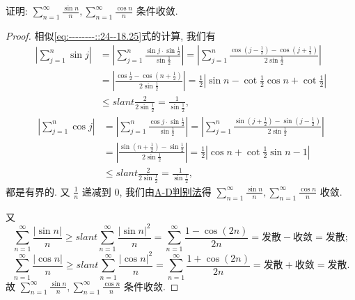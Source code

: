 \documentclass[../../main.tex]{subfiles}
\begin{document}
\begin{example}
证明: $\sum_{n=1}^{\infty} \frac{\sin n}{n}, \sum_{n=1}^{\infty} \frac{\cos n}{n}$ 条件收敛.
\end{example}
\begin{proof}
相似\eqref{eq:--------::24--18.25}式的计算, 我们有
\begin{align*}
\left| \sum_{j=1}^n{\sin j} \right|&=\left| \sum_{j=1}^n{\frac{\sin j\cdot \sin \frac{1}{2}}{\sin \frac{1}{2}}} \right|=\left| \sum_{j=1}^n{\frac{\cos \left( j-\frac{1}{2} \right) -\cos \left( j+\frac{1}{2} \right)}{2\sin \frac{1}{2}}} \right|
\\
&=\left| \frac{\cos \frac{1}{2}-\cos \left( n+\frac{1}{2} \right)}{2\sin \frac{1}{2}} \right|=\frac{1}{2}\left| \sin n-\cot \frac{1}{2}\cos n+\cot \frac{1}{2} \right|
\\
&\leqslant slant \frac{2}{2\sin \frac{1}{2}}=\frac{1}{\sin \frac{1}{2}},
\end{align*}
\begin{align*}
\left| \sum_{j=1}^n{\cos j} \right|&=\left| \sum_{j=1}^n{\frac{\cos j\cdot \sin \frac{1}{2}}{\sin \frac{1}{2}}} \right|=\left| \sum_{j=1}^n{\frac{\sin \left( j+\frac{1}{2} \right) -\sin \left( j-\frac{1}{2} \right)}{2\sin \frac{1}{2}}} \right|
\\
&=\left| \frac{\sin \left( n+\frac{1}{2} \right) -\sin \frac{1}{2}}{2\sin \frac{1}{2}} \right|=\frac{1}{2}\left| \cos n+\cot \frac{1}{2}\sin n-1 \right|
\\
&\leqslant slant \frac{2}{2\sin \frac{1}{2}}=\frac{1}{\sin \frac{1}{2}},
\end{align*}
都是有界的. 又 $\frac{1}{n}$ 递减到 0, 我们由\hyperref[theorem:A-D判别法]{A-D判别法}得 $\sum_{n=1}^{\infty} \frac{\sin n}{n}, \sum_{n=1}^{\infty} \frac{\cos n}{n}$ 收敛.

又
\[
\sum_{n=1}^{\infty} \frac{|\sin n|}{n} \geqslant slant \sum_{n=1}^{\infty} \frac{|\sin n|^2}{n} = \sum_{n=1}^{\infty} \frac{1 - \cos (2n)}{2n} = \text{发散} - \text{收敛} = \text{发散};
\]
\[
\sum_{n=1}^{\infty} \frac{|\cos n|}{n} \geqslant slant \sum_{n=1}^{\infty} \frac{|\cos n|^2}{n} = \sum_{n=1}^{\infty} \frac{1 + \cos (2n)}{2n} = \text{发散} + \text{收敛} = \text{发散}.
\]
故 $\sum_{n=1}^{\infty} \frac{\sin n}{n}, \sum_{n=1}^{\infty} \frac{\cos n}{n}$ 条件收敛.
\end{proof}
\end{document}
